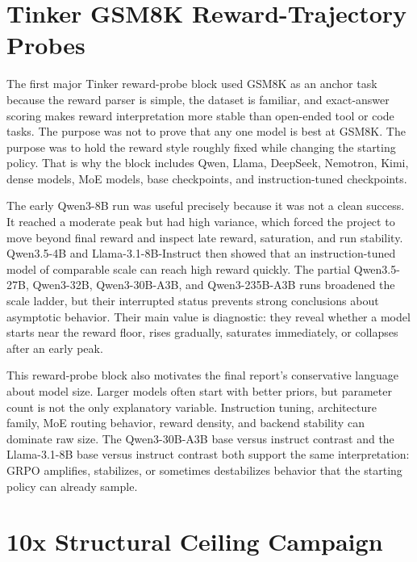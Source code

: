\documentclass[12pt,a4paper]{report}
\begin{document}
\section{Tinker GSM8K Reward-Trajectory Probes}
\label{sec:tinker-gsm8k-scaling}

The first major Tinker reward-probe block used GSM8K as an anchor task because the reward parser is simple, the dataset is familiar, and exact-answer scoring makes reward interpretation more stable than open-ended tool or code tasks. The purpose was not to prove that any one model is best at GSM8K. The purpose was to hold the reward style roughly fixed while changing the starting policy. That is why the block includes Qwen, Llama, DeepSeek, Nemotron, Kimi, dense models, MoE models, base checkpoints, and instruction-tuned checkpoints.

The early Qwen3-8B run was useful precisely because it was not a clean success. It reached a moderate peak but had high variance, which forced the project to move beyond final reward and inspect late reward, saturation, and run stability. Qwen3.5-4B and Llama-3.1-8B-Instruct then showed that an instruction-tuned model of comparable scale can reach high reward quickly. The partial Qwen3.5-27B, Qwen3-32B, Qwen3-30B-A3B, and Qwen3-235B-A3B runs broadened the scale ladder, but their interrupted status prevents strong conclusions about asymptotic behavior. Their main value is diagnostic: they reveal whether a model starts near the reward floor, rises gradually, saturates immediately, or collapses after an early peak.

This reward-probe block also motivates the final report's conservative language about model size. Larger models often start with better priors, but parameter count is not the only explanatory variable. Instruction tuning, architecture family, MoE routing behavior, reward density, and backend stability can dominate raw size. The Qwen3-30B-A3B base versus instruct contrast and the Llama-3.1-8B base versus instruct contrast both support the same interpretation: GRPO amplifies, stabilizes, or sometimes destabilizes behavior that the starting policy can already sample.

\section{10x Structural Ceiling Campaign}
\label{sec:structural-ceiling}
\end{document}
